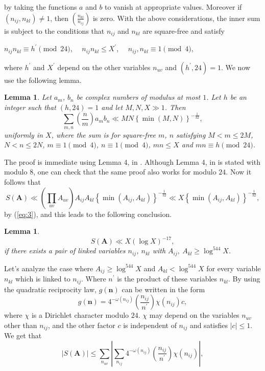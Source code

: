 \documentclass[11pt]{article}
\newcommand{\n}{\textbf{n}}
\newcommand{\A}{ \textbf{A} }
\newtheorem{lemma}[theorem]{Lemma}
\begin{document}
 by taking the functions $a$ and $b$ to vanish at appropriate values. Moreover if $(n_{ij},n_{kl}) \neq 1$, then $\left(\frac{n_{kl}}{n_{ij}}\right)$ is zero. 
 With the above considerations, the inner sum is subject to the conditions that $n_{ij}$ and $n_{kl}$ are square-free and satisfy
\begin{center}
$n_{ij}n_{kl}\equiv h^{\prime} \pmod{24}$, $\quad n_{ij}n_{kl}\leq X^{\prime}$, $\quad n_{ij},n_{kl}\equiv 1\pmod{4}$,
\end{center}
\noindent where $h^{\prime}$ and $X^{\prime}$  depend on the other variables $n_{uv}$ and $(h^{\prime},24)=1$. We now use the following lemma.
\begin{lemma}\label{lemma4}
Let $a_{m}$, $b_{n}$ be complex numbers of modulus at most $1$. Let $h$ be an integer such that $(h,24)=1$ and let $M,N,X\gg 1$. Then 
$$\sum\limits_{m,n}\left(\frac{n}{m}\right)a_{m}b_{n}\ll MN\left\{\min(M,N)\right\}^{-\frac{1}{32}},$$
uniformly in $X$, where the sum is for square-free $m$, $n$ satisfying $M<m\leq 2M$, $N<n\leq 2N$, $m\equiv 1\pmod{4}$, $n\equiv 1\pmod{4}$, $mn\leq X$ and $mn\equiv h\pmod{24}$.
\end{lemma}
\noindent The proof is immediate using Lemma 4, in \cite{HeathBrown}. Although Lemma 4, in \cite{HeathBrown} is stated with modulo $8$, one can check that the same proof also works for modulo $24$.
Now it follows that
$$S(\A)\ll (\prod\limits_{uv}A_{uv})A_{ij}A_{kl}\left\{\min(A_{ij},A_{kl})\right\}^{-\frac{1}{32}}\ll X\left\{\min(A_{ij},A_{kl})\right\}^{-\frac{1}{32}},$$
by (\ref{eq:3}), and this leads to the following conclusion.
\begin{lemma}\label{lemma5}
$$S(\A)\ll X(\log X)^{-17},$$
if there exists a pair of linked variables $n_{ij}$, $n_{kl}$ with
$A_{ij},\: A_{kl}\geq \log^{544} X$.
\end{lemma}
\noindent Let's analyze the case where  $A_{ij}\geq \log^{544} X$ and  $A_{kl}<\log^{544} X$ for every variable $n_{kl}$ which is linked to $n_{ij}$. Where $n^{\prime}$ is the product of these variables $n_{kl}$. By using the quadratic reciprocity law,  $g(\n)$ can be written in the form
$$g(\n)=4^{-\omega(n_{ij})}\left(\frac{n_{ij}}{n^{\prime}}\right)\chi (n_{ij})c,$$
where $\chi$ is a Dirichlet character modulo $24$. $\chi$ may depend on the variables $n_{uv}$ other than $n_{ij}$, and the other factor $c$ is independent of $n_{ij}$ and satisfies $|c|\leq 1$. We get that
\begin{equation}\label{eq:4}
|S(\A)|\leq \sum\limits_{n_{uv}}| \sum\limits_{n_{ij}} 4^{-\omega(n_{ij})}\left(\frac{n_{ij}}{n^{\prime}}\right)\chi (n_{ij})|,
\end{equation}
\end{document}

